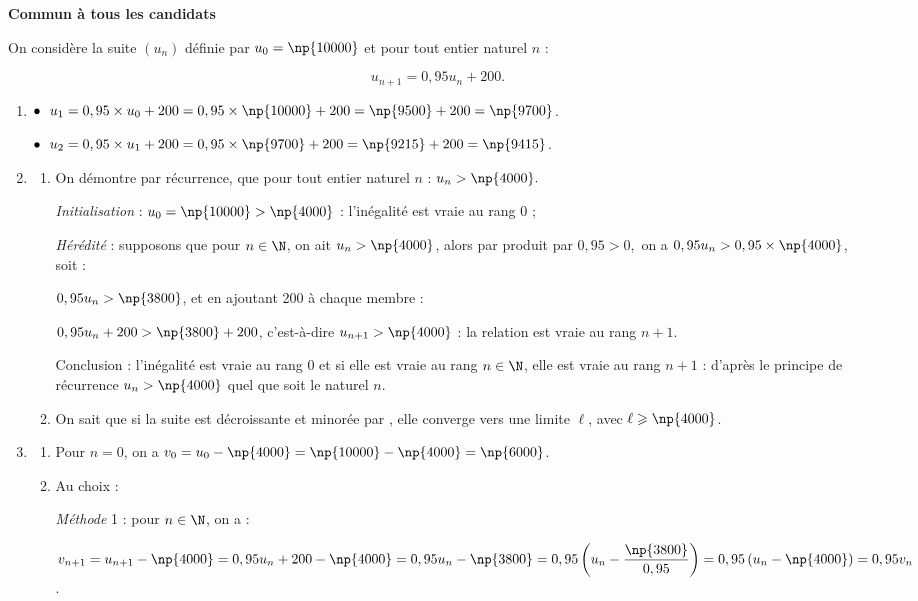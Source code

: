 \textbf{Commun à tous les candidats}

\medskip

On considère la suite $\left(u_n\right)$ définie par $u_0 = \np{10000}$ et pour tout entier naturel $n$ : 

\[u_{n+1} = 0,95u_n + 200.\]

\begin{enumerate}
\item $\bullet~~u_1 = 0,95 \times u_0 + 200 = 0,95 \times \np{10000} + 200 = \np{9500} + 200 = \np{9700}$.

$\bullet~~u_2 = 0,95 \times u_1 + 200 = 0,95 \times \np{9700} + 200 = \np{9215} + 200 = \np{9415}$. 
\item 
	\begin{enumerate}
		\item On démontre  par récurrence, que pour tout entier naturel $n$ : $u_n > \np{4000}.$
		
\emph{Initialisation} : $u_0 = \np{10000} > \np{4000}$ : l'inégalité est vraie au rang $0$ ;

\emph{Hérédité} : supposons que pour $n \in \N$, on ait $u_n > \np{4000}$, alors par produit par $0,95 > 0$,\, on a $0,95u_n > 0,95 \times \np{4000}$, soit :

$0,95u_n > \np{3800}$, et en ajoutant 200 à chaque membre :

$0,95u_n  + 200 > \np{3800} + 200$, c'est-à-dire $u_{n+1} > \np{4000}$ : la relation est vraie au rang $n + 1$.

Conclusion : l'inégalité est vraie au rang $0$ et si elle est vraie au rang $n \in \N$, elle est vraie au rang $n + 1$ : d'après le principe de récurrence $u_n > \np{4000}$ quel que soit le naturel $n$.
		\item 
On sait que si la suite est décroissante et minorée par , elle converge vers une limite $\ell$, avec $\ell \geqslant \np{4000}$.
	\end{enumerate}
\item  
	\begin{enumerate}
		\item 
Pour $n = 0$, on a $v_0 = u_0 -  \np{4000} =  \np{10000} -  \np{4000} =  \np{6000}$.
		\item 
Au choix :
		
\emph{Méthode} 1 : pour $n \in \N$, on a :

$v_{n+1} = u_{n+1} - \np{4000} = 0,95u_n + 200 - \np{4000} = 0,95u_n  - \np{3800} = 0,95\left(u_n - \dfrac{\np{3800}}{0,95}\right) = 0,95\left(u_n - \np{4000}\right) = 0,95v_n$.


\end{enumerate}
\end{enumerate}
